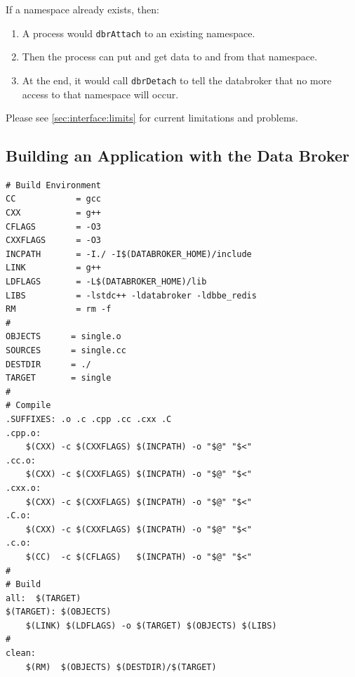 \noindent If a namespace already exists, then:
\begin{enumerate}
\item A process would \texttt{dbrAttach} to an existing namespace.
\item Then the process can put and get data to and from that namespace.
\item At the end, it would call \texttt{dbrDetach} to tell the databroker
  that no more access to that namespace will occur.
\end{enumerate}

Please see \ref{sec:interface:limits} for current limitations and
problems.

\subsection{Building an Application with the Data Broker}
\begin{lstlisting}[basicstyle=\scriptsize\ttfamily,backgroundcolor=\color{backcolour},caption=Example Makefile,captionpos=b,label=code:Makefile]
# Build Environment
CC            = gcc
CXX           = g++
CFLAGS        = -O3
CXXFLAGS      = -O3
INCPATH       = -I./ -I$(DATABROKER_HOME)/include
LINK          = g++ 
LDFLAGS       = -L$(DATABROKER_HOME)/lib
LIBS          = -lstdc++ -ldatabroker -ldbbe_redis
RM            = rm -f
# 
OBJECTS      = single.o
SOURCES      = single.cc
DESTDIR	     = ./
TARGET       = single
#
# Compile
.SUFFIXES: .o .c .cpp .cc .cxx .C
.cpp.o:
    $(CXX) -c $(CXXFLAGS) $(INCPATH) -o "$@" "$<"
.cc.o:
    $(CXX) -c $(CXXFLAGS) $(INCPATH) -o "$@" "$<"
.cxx.o:
    $(CXX) -c $(CXXFLAGS) $(INCPATH) -o "$@" "$<"
.C.o:
    $(CXX) -c $(CXXFLAGS) $(INCPATH) -o "$@" "$<"
.c.o:
    $(CC)  -c $(CFLAGS)   $(INCPATH) -o "$@" "$<"
# 
# Build 
all:  $(TARGET)
$(TARGET): $(OBJECTS) 
    $(LINK) $(LDFLAGS) -o $(TARGET) $(OBJECTS) $(LIBS)
# 
clean:
    $(RM)  $(OBJECTS) $(DESTDIR)/$(TARGET)
\end{lstlisting}

